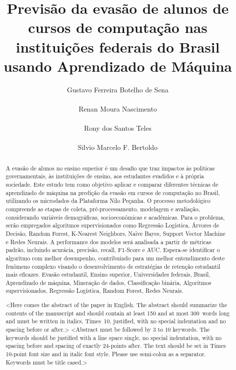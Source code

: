 \documentclass[english, spanish, brazilian]{RBIEarticle} %
\title{Previsão da evasão de alunos de cursos de computação nas instituições federais do Brasil usando Aprendizado de Máquina}
\author{%
	\parbox{6cm}{%
		Gustavo Ferreira Botelho de Sena\\
	}
	\parbox{6cm}{%
		Renan Moura Nascimento\\
	}
        \newline
        \parbox{6cm}{%
		Rony dos Santos Teles\\
	}
        \parbox{6cm}{%
		Silvio Marcelo F. Bertoldo\\
	}
}
\begin{document}
\maketitle

\begin{otherlanguage}{brazilian}
\begin{abstract}
A evasão de alunos no ensino superior é um desafio que traz impactos às políticas governamentais, às instituições de ensino, aos estudantes evadidos e à própria sociedade. Este estudo tem como objetivo aplicar e comparar diferentes técnicas de aprendizado de máquina na predição da evasão em cursos de computação no Brasil, utilizando os microdados da Plataforma Nilo Peçanha. O processo metodológico compreende as etapas de coleta, pré-processamento, modelagem e avaliação, considerando variáveis demográficas, socioeconômicas e acadêmicas. Para o problema, serão empregados algoritmos supervisionados como Regressão Logística, Árvores de Decisão, Random Forest, K-Nearest Neighbors, Naïve Bayes, Support Vector Machine e Redes Neurais. A performance dos modelos será analisada a partir de métricas padrão, incluindo acurácia, precisão, recall, F1-Score e AUC. Espera-se identificar o algoritmo com melhor desempenho, contribuindo para um melhor entendimento deste fenômeno complexo visando o desenvolvimento de estratégias de retenção estudantil mais eficazes.
\keywords Evasão estudantil, Ensino superior, Universidades federais, Brasil, Aprendizado de máquina, Mineração de dados, Classificação binária, Algoritmos supervisionados, Regressão Logística, Random Forest, Redes Neurais.
\end{abstract}
\end{otherlanguage}

\begin{otherlanguage}{english}
\begin{abstract}
<Here comes the abstract of the paper in English. The abstract should summarize the contents of the manuscript and should contain at least 150 and at most 300~words long and must be written in italics, Times~10, justified, with no special indentation and no spacing before or after.>
\keywords <Abstract must be followed by 3 to 10 keywords. The keywords should be justified with a line space single, no special indentation, with no spacing before and spacing of exactly 24-points after. The text should be set in Times 10-point font size and in italic font style. Please use semi-colon as a separator. Keywords must be title cased.>
\end{abstract}
\end{otherlanguage}
\end{document}
